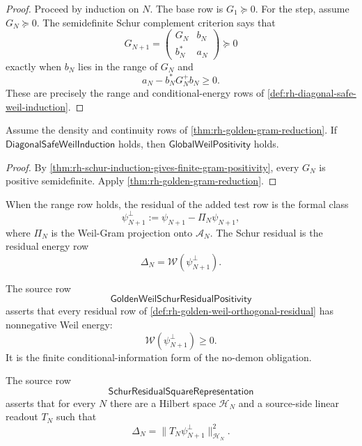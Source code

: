 \begin{proof}
Proceed by induction on $N$.  The base row is $G_1\succeq0$.  For the
step, assume $G_N\succeq0$.  The semidefinite Schur complement criterion
says that
$$
G_{N+1}
=
\begin{pmatrix}
G_N & b_N\\
b_N^\ast & a_N
\end{pmatrix}
\succeq0
$$
exactly when $b_N$ lies in the range of $G_N$ and
$$
a_N-b_N^\ast G_N^+b_N\ge0.
$$
These are precisely the range and conditional-energy rows of
\autoref{def:rh-diagonal-safe-weil-induction}.
\end{proof}

\begin{corollary}
\label{cor:rh-diagonal-safe-weil-induction-global-positivity}
Assume the density and continuity rows of
\autoref{thm:rh-golden-gram-reduction}.  If
$\mathsf{DiagonalSafeWeilInduction}$ holds, then
$\mathsf{GlobalWeilPositivity}$ holds.
\end{corollary}

\begin{proof}
By \autoref{thm:rh-schur-induction-gives-finite-gram-positivity},
every $G_N$ is positive semidefinite.  Apply
\autoref{thm:rh-golden-gram-reduction}.
\end{proof}

\begin{definition}
\label{def:rh-golden-weil-orthogonal-residual}
When the range row holds, the residual of the added test row is the
formal class
$$
\psi_{N+1}^{\perp}
:=
\psi_{N+1}-\Pi_N\psi_{N+1},
$$
where $\Pi_N$ is the Weil-Gram projection onto $\mathcal A_N$.  The
Schur residual is the residual energy row
$$
\Delta_N=\mathcal W(\psi_{N+1}^{\perp}).
$$
\end{definition}

\begin{definition}
\label{def:rh-golden-weil-schur-residual-positivity}
The source row
$$
\mathsf{GoldenWeilSchurResidualPositivity}
$$
asserts that every residual row of
\autoref{def:rh-golden-weil-orthogonal-residual} has nonnegative Weil
energy:
$$
\mathcal W(\psi_{N+1}^{\perp})\ge0.
$$
It is the finite conditional-information form of the no-demon
obligation.
\end{definition}

\begin{definition}
\label{def:rh-schur-residual-square-representation}
The source row
$$
\mathsf{SchurResidualSquareRepresentation}
$$
asserts that for every $N$ there are a Hilbert space $\mathcal H_N$ and
a source-side linear readout $T_N$ such that
$$
\Delta_N
=
\|T_N\psi_{N+1}^{\perp}\|_{\mathcal H_N}^2.
$$
\end{definition}

